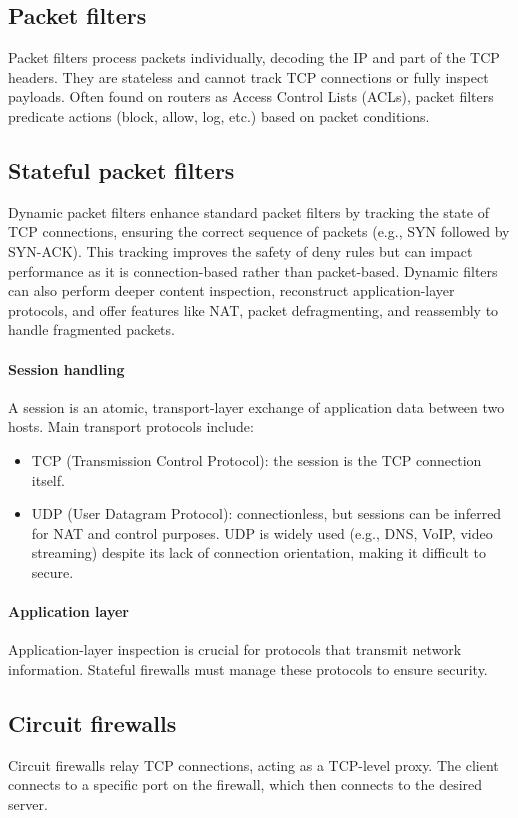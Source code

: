 \subsection{Packet filters}
Packet filters process packets individually, decoding the IP and part of the TCP headers. 
They are stateless and cannot track TCP connections or fully inspect payloads. 
Often found on routers as Access Control Lists (ACLs), packet filters predicate actions (block, allow, log, etc.) based on packet conditions.

\subsection{Stateful packet filters}
Dynamic packet filters enhance standard packet filters by tracking the state of TCP connections, ensuring the correct sequence of packets (e.g., SYN followed by SYN-ACK). 
This tracking improves the safety of deny rules but can impact performance as it is connection-based rather than packet-based. 
Dynamic filters can also perform deeper content inspection, reconstruct application-layer protocols, and offer features like NAT, packet defragmenting, and reassembly to handle fragmented packets.

\paragraph*{Session handling}
A session is an atomic, transport-layer exchange of application data between two hosts. Main transport protocols include:
\begin{itemize}
    \item TCP (Transmission Control Protocol): the session is the TCP connection itself.
    \item UDP (User Datagram Protocol): connectionless, but sessions can be inferred for NAT and control purposes.
        UDP is widely used (e.g., DNS, VoIP, video streaming) despite its lack of connection orientation, making it difficult to secure.
\end{itemize}

\paragraph*{Application layer}
Application-layer inspection is crucial for protocols that transmit network information. 
Stateful firewalls must manage these protocols to ensure security.

\subsection{Circuit firewalls}
Circuit firewalls relay TCP connections, acting as a TCP-level proxy. 
The client connects to a specific port on the firewall, which then connects to the desired server.

